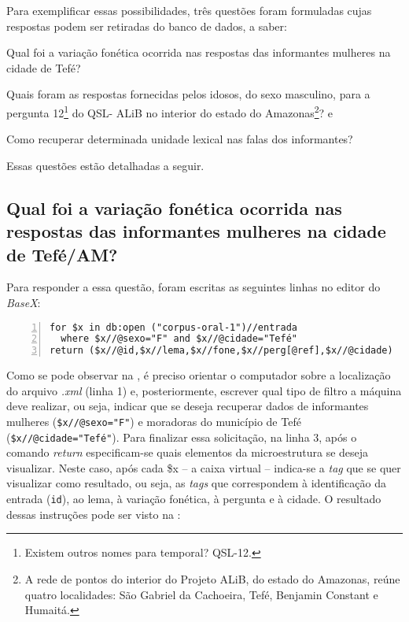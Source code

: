 \documentclass[portuguese]{textolivre}
\begin{document}
Para exemplificar essas possibilidades, três questões foram formuladas cujas respostas podem ser retiradas do banco de dados, a saber: 
\begin{enumerate*}[label=\roman*)]
\item Qual foi a variação fonética ocorrida nas respostas das informantes mulheres na cidade de Tefé? 
\item Quais foram as respostas fornecidas pelos idosos, do sexo masculino, para a pergunta 12\footnote{Existem outros nomes para temporal? QSL-12.} do QSL- ALiB no interior do estado do Amazonas\footnote{A rede de pontos do interior do Projeto ALiB, do estado do Amazonas, reúne quatro localidades: São Gabriel da Cachoeira, Tefé, Benjamin Constant e Humaitá.}? e 
\item Como recuperar determinada unidade lexical nas falas dos informantes?
\end{enumerate*} Essas questões estão detalhadas a seguir.


\subsection{Qual foi a variação fonética ocorrida nas respostas das informantes mulheres na cidade de Tefé/AM?}
Para responder a essa questão, foram escritas as seguintes linhas no editor do \emph{BaseX}:

\begin{lstlisting}[language=XQuery, label=tab04, caption={Instruções para a recuperação de dados referentes à variação fonética.}, source={Elaboração do autor.}, numbers=left]
for $x in db:open ("corpus-oral-1")//entrada
  where $x//@sexo="F" and $x//@cidade="Tefé" 
return ($x//@id,$x//lema,$x//fone,$x//perg[@ref],$x//@cidade)
\end{lstlisting} %

Como se pode observar na , é preciso orientar o computador sobre a localização do arquivo \emph{.xml} (linha 1) e, posteriormente, escrever qual tipo de filtro a máquina deve realizar, ou seja, indicar que se deseja recuperar dados de informantes mulheres (\lstinline[language=XML]!$x//@sexo="F"!) e moradoras do município de Tefé (\lstinline[language=XML]!$x//@cidade="Tefé"!). Para finalizar essa solicitação, na linha 3, após o comando \emph{return} especificam-se quais elementos da microestrutura se deseja visualizar. Neste caso, após cada \$x – a caixa virtual – indica-se a \emph{tag} que se quer visualizar como resultado, ou seja, as \emph{tags} que correspondem à identificação da entrada (\lstinline[language=XML]!id!), ao lema, à variação fonética, à pergunta e à cidade. O resultado dessas instruções pode ser visto na :
\end{document}

